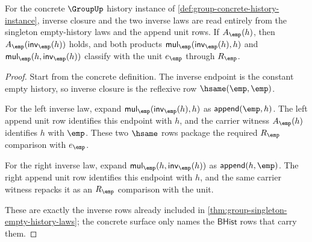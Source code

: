 \begin{theorem}
\label{thm:group-concrete-inverse-surface}
For the concrete $\GroupUp$ history instance of
\autoref{def:group-concrete-history-instance}, inverse closure and the two
inverse laws are read entirely from the singleton empty-history laws and the
append unit rows. If $A_{\emp}(h)$, then
$A_{\emp}(\mathsf{inv}_{\emp}(h))$ holds, and both products
$\mathsf{mul}_{\emp}(\mathsf{inv}_{\emp}(h),h)$ and
$\mathsf{mul}_{\emp}(h,\mathsf{inv}_{\emp}(h))$ classify with the unit
$e_{\emp}$ through $R_{\emp}$.
\end{theorem}
\begin{proof}
Start from the concrete definition. The inverse endpoint is the constant
empty history, so inverse closure is the reflexive row
$\hsame(\emp,\emp)$.

For the left inverse law, expand
$\mathsf{mul}_{\emp}(\mathsf{inv}_{\emp}(h),h)$ as
$\mathsf{append}(\emp,h)$. The left append unit row identifies this endpoint
with $h$, and the carrier witness $A_{\emp}(h)$ identifies $h$ with $\emp$.
These two $\hsame$ rows package the required $R_{\emp}$ comparison with
$e_{\emp}$.

For the right inverse law, expand
$\mathsf{mul}_{\emp}(h,\mathsf{inv}_{\emp}(h))$ as
$\mathsf{append}(h,\emp)$. The right append unit row identifies this endpoint
with $h$, and the same carrier witness repacks it as an $R_{\emp}$ comparison
with the unit.

These are exactly the inverse rows already included in
\autoref{thm:group-singleton-empty-history-laws}; the concrete surface only
names the $\mathsf{BHist}$ rows that carry them.
\end{proof}

